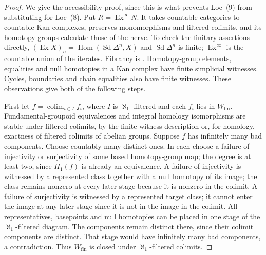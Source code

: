 \begin{proof}
We give the accessibility proof, since this is what prevents Loc~(9)
from substituting for Loc~(8).  Put $R=\operatorname{Ex}^{\infty}N$.
It takes countable categories to countable Kan complexes, preserves
monomorphisms and filtered colimits, and its homotopy groups calculate
those of the nerve.  To check the finitary assertions directly,
$(\operatorname{Ex}X)_n=\operatorname{Hom}(\operatorname{Sd}\Delta^n,X)$
and $\operatorname{Sd}\Delta^n$ is finite; $\operatorname{Ex}^{\infty}$
is the countable union of the iterates.  Fibrancy is
\citet[Proposition~2.1.39]{Cisinski2006B}.  Homotopy-group elements,
equalities and null homotopies in a Kan complex have finite simplicial
witnesses.  Cycles, boundaries and chain equalities also have finite
witnesses.  These observations give both of the following steps.

First let $f=\operatorname*{colim}_{i\in I}f_i$, where $I$ is
$\aleph_1$-filtered and each $f_i$ lies in $W_{\mathrm{fin}}$.
Fundamental-groupoid equivalences and integral homology isomorphisms
are stable under filtered colimits, by the finite-witness description
or, for homology, exactness of filtered colimits of abelian groups.
Suppose $f$ has infinitely many bad components.  Choose countably many
distinct ones.  In each choose a failure of injectivity or surjectivity
of some based homotopy-group map; the degree is at least two, since
$\Pi_1(f)$ is already an equivalence.  A failure of injectivity is
witnessed by a represented class together with a null homotopy of its
image; the class remains nonzero at every later stage because it is
nonzero in the colimit.  A failure of surjectivity is witnessed by a
represented target class; it cannot enter the image at any later stage
since it is not in the image in the colimit.  All representatives,
basepoints and null homotopies can be placed in one stage of the
$\aleph_1$-filtered diagram.  The components remain distinct there,
since their colimit components are distinct.  That stage would have
infinitely many bad components, a contradiction.  Thus $W_{\mathrm{fin}}$
is closed under $\aleph_1$-filtered colimits.


\end{proof}
